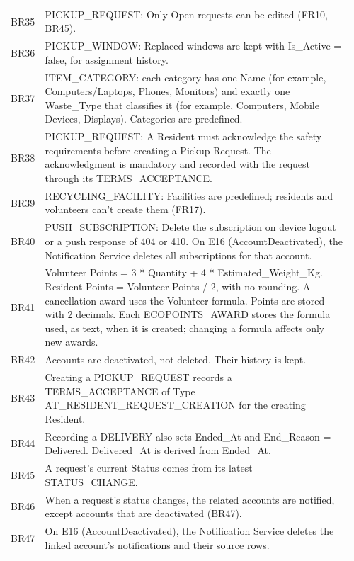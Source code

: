 \begin{longtable}{@{}p{0.07\linewidth}>{\raggedright\arraybackslash}p{0.89\linewidth}@{}}
\addlinespace[2pt]
BR35 & PICKUP\_REQUEST: Only Open requests can be edited (FR10, BR45). \\
\addlinespace[2pt]
BR36 & PICKUP\_WINDOW: Replaced windows are kept with Is\_Active = false, for assignment history. \\
\addlinespace[2pt]
BR37 & ITEM\_CATEGORY: each category has one Name (for example, Computers/Laptops, Phones, Monitors) and exactly one Waste\_Type that classifies it (for example, Computers, Mobile Devices, Displays). Categories are predefined. \\
\addlinespace[2pt]
BR38 & PICKUP\_REQUEST: A Resident must acknowledge the safety requirements before creating a Pickup Request. The acknowledgment is mandatory and recorded with the request through its TERMS\_ACCEPTANCE. \\
\addlinespace[2pt]
BR39 & RECYCLING\_FACILITY: Facilities are predefined; residents and volunteers can't create them (FR17). \\
\addlinespace[2pt]
BR40 & PUSH\_SUBSCRIPTION: Delete the subscription on device logout or a push response of 404 or 410. On E16 (AccountDeactivated), the Notification Service deletes all subscriptions for that account. \\
\addlinespace[2pt]
BR41 & Volunteer Points = 3 * Quantity + 4 * Estimated\_Weight\_Kg. Resident Points = Volunteer Points / 2, with no rounding. A cancellation award uses the Volunteer formula. Points are stored with 2 decimals. Each ECOPOINTS\_AWARD stores the formula used, as text, when it is created; changing a formula affects only new awards. \\
\addlinespace[2pt]
BR42 & Accounts are deactivated, not deleted. Their history is kept. \\
\addlinespace[2pt]
BR43 & Creating a PICKUP\_REQUEST records a TERMS\_ACCEPTANCE of Type AT\_RESIDENT\_REQUEST\_CREATION for the creating Resident. \\
\addlinespace[2pt]
BR44 & Recording a DELIVERY also sets Ended\_At and End\_Reason = Delivered. Delivered\_At is derived from Ended\_At. \\
\addlinespace[2pt]
BR45 & A request's current Status comes from its latest STATUS\_CHANGE. \\
\addlinespace[2pt]
BR46 & When a request's status changes, the related accounts are notified, except accounts that are deactivated (BR47). \\
\addlinespace[2pt]
BR47 & On E16 (AccountDeactivated), the Notification Service deletes the linked account's notifications and their source rows. \\

\end{longtable}
